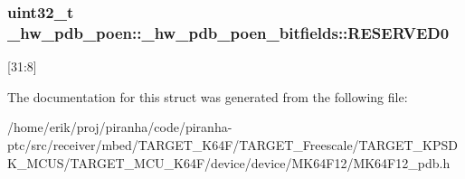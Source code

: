 \subsubsection[{\texorpdfstring{R\+E\+S\+E\+R\+V\+E\+D0}{RESERVED0}}]{\setlength{\rightskip}{0pt plus 5cm}uint32\+\_\+t \+\_\+hw\+\_\+pdb\+\_\+poen\+::\+\_\+hw\+\_\+pdb\+\_\+poen\+\_\+bitfields\+::\+R\+E\+S\+E\+R\+V\+E\+D0}\hypertarget{struct__hw__pdb__poen_1_1__hw__pdb__poen__bitfields_aefa0ca7e831070e6fcbad1fe46ca1376}{}\label{struct__hw__pdb__poen_1_1__hw__pdb__poen__bitfields_aefa0ca7e831070e6fcbad1fe46ca1376}
\mbox{[}31\+:8\mbox{]} 

The documentation for this struct was generated from the following file\+:\begin{DoxyCompactItemize}
\item 
/home/erik/proj/piranha/code/piranha-\/ptc/src/receiver/mbed/\+T\+A\+R\+G\+E\+T\+\_\+\+K64\+F/\+T\+A\+R\+G\+E\+T\+\_\+\+Freescale/\+T\+A\+R\+G\+E\+T\+\_\+\+K\+P\+S\+D\+K\+\_\+\+M\+C\+U\+S/\+T\+A\+R\+G\+E\+T\+\_\+\+M\+C\+U\+\_\+\+K64\+F/device/device/\+M\+K64\+F12/M\+K64\+F12\+\_\+pdb.\+h\end{DoxyCompactItemize}
